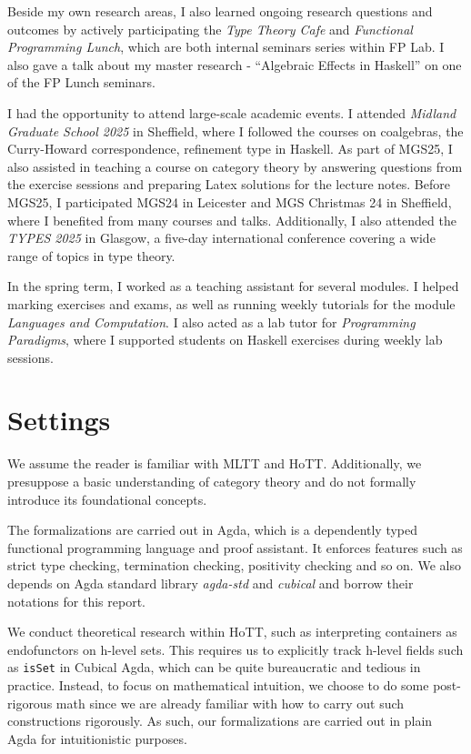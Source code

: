 Beside my own research areas, I also learned ongoing research questions and outcomes by actively participating the \textit{Type Theory Cafe} and \textit{Functional Programming Lunch}, which are both internal seminars series within FP Lab. I also gave a talk about my master research - ``Algebraic Effects in Haskell'' on one of the FP Lunch seminars.

I had the opportunity to attend large-scale academic events. I attended \textit{Midland Graduate School 2025} in Sheffield, where I followed the courses on coalgebras, the Curry-Howard correspondence, refinement type in Haskell. As part of MGS25, I also assisted in teaching a course on category theory by answering questions from the exercise sessions and preparing Latex solutions for the lecture notes. Before MGS25, I participated MGS24 in Leicester and MGS Christmas 24 in Sheffield, where I benefited from many courses and talks. Additionally, I also attended the \textit{TYPES 2025} in Glasgow, a five-day international conference covering a wide range of topics in type theory.

In the spring term, I worked as a teaching assistant for several modules. I helped marking exercises and exams, as well as running weekly tutorials for the module \textit{Languages and Computation}. I also acted as a lab tutor for \textit{Programming Paradigms}, where I supported students on Haskell exercises during weekly lab sessions.

\section{Settings}

We assume the reader is familiar with MLTT and HoTT. Additionally, we presuppose a basic understanding of category theory and do not formally introduce its foundational concepts.

The formalizations are carried out in Agda, which is a dependently typed functional programming language and proof assistant. It enforces features such as strict type checking, termination checking, positivity checking and so on. We also depends on Agda standard library \textit{agda-std} and \textit{cubical} and borrow their notations for this report.

We conduct theoretical research within HoTT, such as interpreting containers as endofunctors on h-level sets. This requires us to explicitly track h-level fields such as \texttt{isSet} in Cubical Agda, which can be quite bureaucratic and tedious in practice. Instead, to focus on mathematical intuition, we choose to do some post-rigorous math since we are already familiar with how to carry out such constructions rigorously. As such, our formalizations are carried out in plain Agda for intuitionistic purposes.

